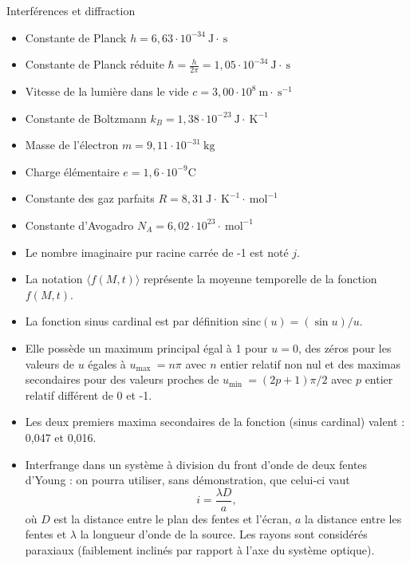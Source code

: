\begin{exo}[PC][1][devoir]{Interférences et diffraction}
{
\begin{itemize}
  \item Constante de Planck $h=6,63 \cdot 10^{-34} \mathrm{~J} \cdot \mathrm{~s}$
  \item Constante de Planck réduite $\hbar=\frac{h}{2 \pi}=1,05 \cdot 10^{-34} \mathrm{~J} \cdot \mathrm{~s}$
  \item Vitesse de la lumière dans le vide $c=3,00 \cdot 10^{8} \mathrm{~m} \cdot \mathrm{~s}^{-1}$
  \item Constante de Boltzmann $k_{B}=1,38 \cdot 10^{-23} \mathrm{~J} \cdot \mathrm{~K}^{-1}$
  \item Masse de l'électron $m=9,11 \cdot 10^{-31} \mathrm{~kg}$
  \item Charge élémentaire $e=1,6 \cdot 10^{-9} \mathrm{C}$
  \item Constante des gaz parfaits $R=8,31 \mathrm{~J} \cdot \mathrm{~K}^{-1} \cdot \mathrm{~mol}^{-1}$
  \item Constante d'Avogadro $N_{A}=6,02 \cdot 10^{23} \cdot \mathrm{~mol}^{-1}$
\end{itemize}

\begin{itemize}
  \item Le nombre imaginaire pur racine carrée de -1 est noté $j$.
  \item La notation $\langle f(M, t)\rangle$ représente la moyenne temporelle de la fonction $f(M, t)$.
  \item La fonction sinus cardinal est par définition $\text{sinc}(u)=(\sin u) / u$.
  \item Elle possède un maximum principal égal à 1 pour $u=0$, des zéros pour les valeurs de $u$ égales à $u_{\text {max }}=n \pi$ avec $n$ entier relatif non nul et des maximas secondaires pour des valeurs proches de $u_{\text {min }}=(2 p+1) \pi / 2$ avec $p$ entier relatif différent de 0 et -1.
  \item Les deux premiers maxima secondaires de la fonction (sinus cardinal) valent : 0,047 et 0,016.
  \item Interfrange dans un système à division du front d'onde de deux fentes d'Young : on pourra utiliser, sans démonstration, que celui-ci vaut
  \begin{equation}
    i =\frac{\lambda D}{a},
  \end{equation}
  où $D$ est la distance entre le plan des fentes et l'écran, $a$ la distance entre les fentes et $\lambda$ la longueur d'onde de la source. Les rayons sont considérés paraxiaux (faiblement inclinés par rapport à l'axe du système optique).
\end{itemize}
}



\end{exo}
